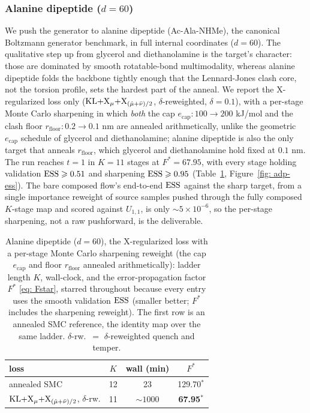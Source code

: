 \documentclass{article}
\begin{document}
\FloatBarrier
\subsubsection{Alanine dipeptide ($d = 60$)}
\label{sec: adp}

We push the generator to alanine dipeptide (Ac-Ala-NHMe), the canonical Boltzmann generator benchmark,
in full internal coordinates ($d = 60$). The qualitative step up from glycerol and diethanolamine is the
target's character: those are dominated by smooth rotatable-bond multimodality, whereas alanine dipeptide folds the backbone
tightly enough that the Lennard-Jones clash core, not the torsion profile, sets the hardest part of the
anneal. We report the X-regularized loss only ($\mathrm{KL}{+}\mathrm{X}_\mu{+}\mathrm{X}_{(\hat\mu+\bar\nu)/2}$,
$\delta$-reweighted, $\delta = 0.1$), with a per-stage Monte Carlo sharpening in which \emph{both} the cap
$e_{\mathrm{cap}}\!:\!100\!\to\!200$ kJ/mol and the clash floor $r_{\mathrm{floor}}\!:\!0.2\!\to\!0.1$ nm are annealed arithmetically, unlike the geometric
$e_{\mathrm{cap}}$ schedule of glycerol and diethanolamine; alanine dipeptide is also the only target that anneals $r_{\mathrm{floor}}$, which glycerol and diethanolamine hold fixed at $0.1$ nm. The run reaches $t = 1$ in $K = 11$ stages at $F^{*} = 67.95$,
with every stage holding validation $\mathrm{ESS} \geqslant 0.51$ and sharpening $\mathrm{ESS} \geqslant 0.95$
(Table~\ref{tab: adp}, Figure~\ref{fig: adp-ess}). The bare composed flow's end-to-end $\mathrm{ESS}$ against the sharp
target, from a single importance reweight of source samples pushed through the fully composed $K$-stage map and
scored against $U_{1,1}$, is only ${\sim}5\times10^{-6}$, so the per-stage sharpening, not a raw pushforward,
is the deliverable.

\begin{table}[h]
    \centering
    \small
    \begin{tabular}{@{}lccc@{}}
        \toprule
        loss & $K$ & wall (min) & $F^{*}$ \\
        \midrule
        annealed SMC                                           & 12 & 23  & 129.70$^{*}$ \\
        $\mathrm{KL}{+}\mathrm{X}_\mu{+}\mathrm{X}_{(\hat\mu+\bar\nu)/2}$, $\delta$-rw. & 11 & ${\sim}1000$ & \textbf{67.95}$^{*}$ \\
        \bottomrule
    \end{tabular}
    \caption{Alanine dipeptide ($d = 60$), the X-regularized loss with a per-stage Monte Carlo sharpening
    reweight (the cap $e_{\mathrm{cap}}$ and floor $r_{\mathrm{floor}}$ annealed arithmetically): ladder length $K$,
    wall-clock, and the error-propagation factor $F^{*}$ \eqref{eq: Fstar}, starred throughout because every
    entry uses the smooth validation $\mathrm{ESS}$ (smaller better; $F^{*}$ includes the sharpening reweight). The
    first row is an annealed SMC reference, the identity map over the same ladder.
    $\delta$-rw.\ $=$ $\delta$-reweighted quench and temper.}
    \label{tab: adp}
\end{table}
\end{document}
